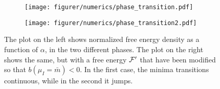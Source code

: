 \begin{figure}
    \centering
    \begin{subfigure}{0.49\textwidth}
        \texttt{[image: figurer/numerics/phase\_transition.pdf]}
    \end{subfigure}
    \begin{subfigure}{0.49\textwidth}
        \texttt{[image: figurer/numerics/phase\_transition2.pdf]}
    \end{subfigure}
    \caption{The plot on the left shows normalized free energy density as a function of $\alpha$, in the two different phases. The plot on the right shows the same, but with a free energy $\mathcal{F}'$ that have been modified so that $b(\mu_I=\bar m)<0$.
    In the first case, the minima transitions continuous, while in the second it jumps.}
    \label{fig:phase transition}
\end{figure}




